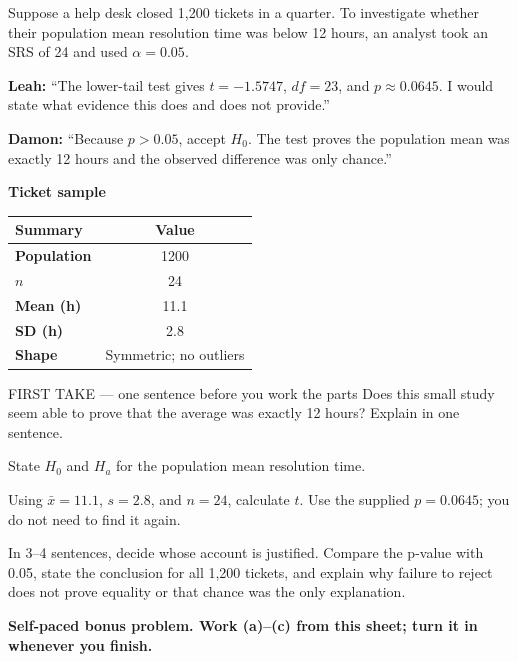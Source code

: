 \documentclass[14pt]{extarticle}
\begin{document}
\pagestyle{empty}


\noindent\begin{minipage}[t]{0.57\linewidth}
\vspace{0pt}
Suppose a help desk closed 1,200 tickets in a quarter. To investigate whether their population mean resolution time was below 12 hours, an analyst took an SRS of 24 and used $\alpha=0.05$.\par\smallskip \textbf{Leah:} ``The lower-tail test gives $t=-1.5747$, $df=23$, and $p\approx0.0645$. I would state what evidence this does and does not provide.''\par \textbf{Damon:} ``Because $p>0.05$, accept $H_0$. The test proves the population mean was exactly 12 hours and the observed difference was only chance.''\par
\end{minipage}\hfill
\begin{minipage}[t]{0.40\linewidth}
\vspace{0pt}
\begin{center}
\textbf{Ticket sample}\par\smallskip
\begin{tabular}{|l|c|}
\hline
\textbf{Summary} & \textbf{Value} \\ \hline
\textbf{Population} & 1200 \\ \hline
\textbf{$n$} & 24 \\ \hline
\textbf{Mean (h)} & 11.1 \\ \hline
\textbf{SD (h)} & 2.8 \\ \hline
\textbf{Shape} & Symmetric; no outliers \\ \hline
\end{tabular}
\end{center}
\end{minipage}

\begin{firsttakebox}{FIRST TAKE --- one sentence before you work the parts}
Does this small study seem able to prove that the average was exactly 12 hours? Explain in one sentence.
\end{firsttakebox}

\begin{description}[leftmargin=1.15in, labelwidth=1in, itemsep=2pt, topsep=2pt]
  \item[\dokbadge{1}~(a)] State $H_0$ and $H_a$ for the population mean resolution time.
  \item[\dokbadge{2}~(b)] Using $\bar x=11.1$, $s=2.8$, and $n=24$, calculate $t$. Use the supplied $p=0.0645$; you do not need to find it again.
  \item[\dokbadge{3}~(c)] In 3--4 sentences, decide whose account is justified. Compare the p-value with 0.05, state the conclusion for all 1,200 tickets, and explain why failure to reject does not prove equality or that chance was the only explanation.
\end{description}

\vfill
\textbf{Self-paced bonus problem. Work (a)--(c) from this sheet; turn it in whenever you finish.}
\end{document}
